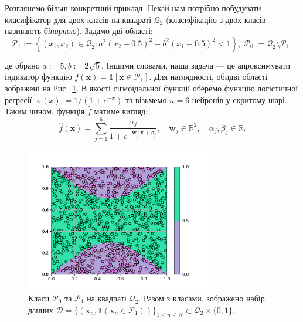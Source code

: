 \begin{example}
	Розглянемо більш конкретний приклад. Нехай нам потрібно побудувати 
	класифікатор для двох класів на квадраті $\mathcal{Q}_2$ (класифікацію з двох 
	класів називають \textit{бінарною}). Задамо дві області:
	\begin{equation*}
		\mathcal{P}_1 := \left\{(x_1,x_2) \in \mathcal{Q}_2: a^2\left(x_2-0.5\right)^2 - b^2\left(x_1-0.5\right)^2 < 1\right\}, \; \mathcal{P}_0 := \mathcal{Q}_2 \setminus \mathcal{P}_1,
	\end{equation*}

	де обрано $a:=5,b:=2\sqrt{5}$. Іншими словами, наша задача --- це апроксимувати індикатор функцію
	$f(\mathbf{x}) = \mathds{1}[\mathbf{x} \in \mathcal{P}_1]$. Для наглядності,
	обидві області зображені на Рис.~\ref{fig:classification_example}. В якості
	сігмоїдальної функції оберемо функцію логістичної регресії: $\sigma(x) :=
	1/(1+e^{-x})$ та візьмемо $n=6$ нейронів у скритому шарі. Таким чином,
	функція $\hat{f}$ матиме вигляд:
	\begin{equation*}
		\hat{f}(\mathbf{x}) = \sum_{j=1}^6 \frac{\alpha_j}{1+e^{-\boldsymbol{w}_j^{\top}\mathbf{x} + \beta_j}}, \quad \boldsymbol{w}_j \in \mathbb{R}^2, \quad \alpha_j,\beta_j \in \mathbb{R}.
	\end{equation*}

	\begin{figure}
		\centering
		\includegraphics[width=0.75\textwidth]{code/classification-example.pdf}
		\caption{Класи $\mathcal{P}_0$ та $\mathcal{P}_1$ на квадраті
		$\mathcal{Q}_2$. Разом з класами, зображено набір данних
		$\mathcal{D}=\{(\mathbf{x}_n,\mathds{1}(\mathbf{x}_n \in
		\mathcal{P}_1))\}_{1 \leq n \leq N} \subset \mathcal{Q}_2 \times
		\{0,1\}$.}
		\label{fig:classification_example}
	\end{figure}


\end{example}
